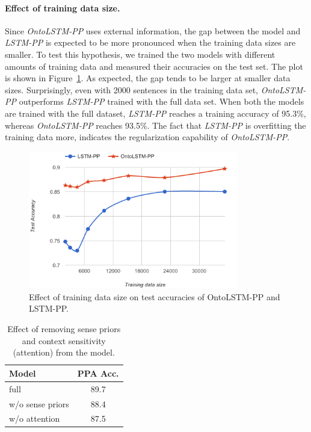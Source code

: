 \paragraph{Effect of training data size.}
Since \textit{OntoLSTM-PP} uses external information, the gap between the model and \textit{LSTM-PP} is expected to be more pronounced when the training data sizes are smaller. To test this hypothesis, we trained the two models with different amounts of training data and measured their accuracies on the test set. The plot is shown in Figure~\ref{fig:ontolstm_pp_data_size_variation}. As expected, the gap tends to be larger at smaller data sizes. Surprisingly, even with 2000 sentences in the training data set, \textit{OntoLSTM-PP} outperforms \textit{LSTM-PP} trained with the full data set. 
When both the models are trained with the full dataset, \textit{LSTM-PP} reaches a training accuracy of 95.3\%, whereas \textit{OntoLSTM-PP} reaches 93.5\%. The fact that \textit{LSTM-PP} is overfitting the training data more, indicates the regularization capability of \textit{OntoLSTM-PP}.
\begin{figure}
\begin{center}
\includegraphics[width=3.6in]{figures/training_data_size.png}
\caption{Effect of training data size on test accuracies of OntoLSTM-PP and LSTM-PP.}
\label{fig:ontolstm_pp_data_size_variation}
\end{center}
\end{figure}

\begin{table}
    \centering
    \begin{tabular}{lc}
    \toprule
    \textbf{Model}	& \textbf{PPA Acc.}\\
    \midrule
    full		& 89.7 \\
    w/o sense priors	& 88.4 \\
    w/o attention		& 87.5 \\
    \bottomrule
    \end{tabular}
    \caption{Effect of removing sense priors and context sensitivity (attention) from the model.}\label{tab:ontolstm_pp_ablation_results}
\end{table}

